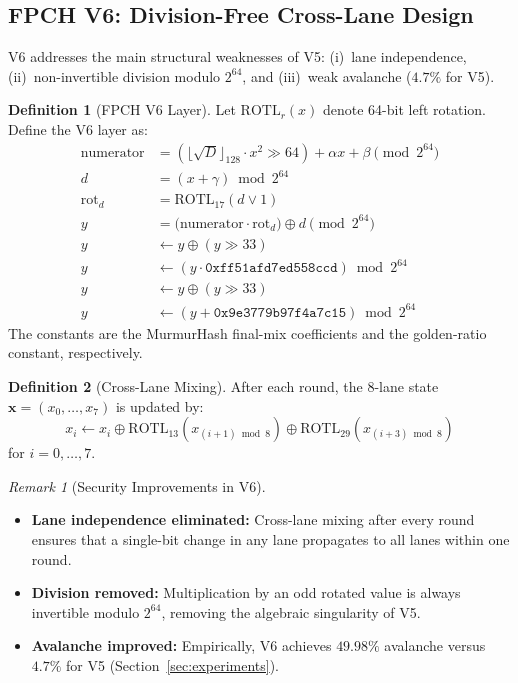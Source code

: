\documentclass[11pt,a4paper]{article}
\theoremstyle{plain}
\theoremstyle{definition}
\newtheorem{definition}{Definition}[section]
\theoremstyle{remark}
\newtheorem{remark}{Remark}[section]
\begin{document}
\subsection{FPCH V6: Division-Free Cross-Lane Design}

V6 addresses the main structural weaknesses of V5: (i)~lane independence, (ii)~non-invertible division modulo $2^{64}$, and (iii)~weak avalanche ($4.7\%$ for V5).

\begin{definition}[FPCH V6 Layer]\label{def:fpchv6}
Let $\text{ROTL}_r(x)$ denote 64-bit left rotation. Define the V6 layer as:
\begin{align}
\text{numerator} &= (\lfloor\sqrt{D}\rfloor_{128} \cdot x^2 \gg 64) + \alpha x + \beta \pmod{2^{64}} \\
d &= (x + \gamma) \bmod 2^{64} \\
\text{rot}_d &= \text{ROTL}_{17}(d \lor 1) \\
y &= \bigl(\text{numerator} \cdot \text{rot}_d\bigr) \oplus d \pmod{2^{64}} \\
y &\gets y \oplus (y \gg 33) \\
y &\gets (y \cdot \texttt{0xff51afd7ed558ccd}) \bmod 2^{64} \\
y &\gets y \oplus (y \gg 33) \\
y &\gets (y + \texttt{0x9e3779b97f4a7c15}) \bmod 2^{64}
\end{align}
The constants are the MurmurHash final-mix coefficients and the golden-ratio constant, respectively.
\end{definition}

\begin{definition}[Cross-Lane Mixing]\label{def:crosslane}
After each round, the 8-lane state $\mathbf{x} = (x_0,\dots,x_7)$ is updated by:
\begin{equation}
x_i \gets x_i \oplus \text{ROTL}_{13}(x_{(i+1) \bmod 8}) \oplus \text{ROTL}_{29}(x_{(i+3) \bmod 8})
\end{equation}
for $i = 0,\dots,7$.
\end{definition}

\begin{remark}[Security Improvements in V6]
\begin{itemize}
    \item \textbf{Lane independence eliminated:} Cross-lane mixing after every round ensures that a single-bit change in any lane propagates to all lanes within one round.
    \item \textbf{Division removed:} Multiplication by an odd rotated value is always invertible modulo $2^{64}$, removing the algebraic singularity of V5.
    \item \textbf{Avalanche improved:} Empirically, V6 achieves $49.98\%$ avalanche versus $4.7\%$ for V5 (Section~\ref{sec:experiments}).
\end{itemize}
\end{remark}
\end{document}

